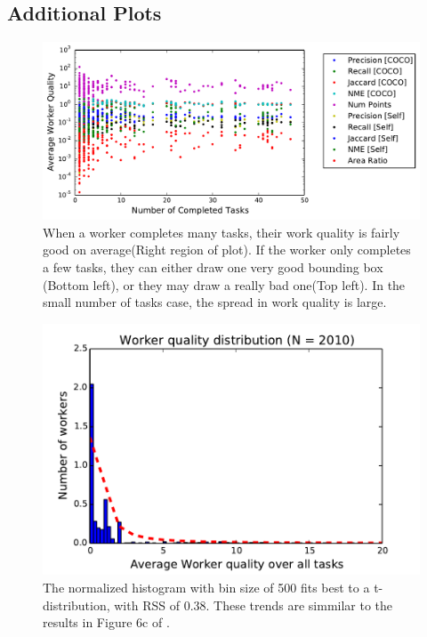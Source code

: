 \documentclass[12pt]{article}
\begin{document}
\begin{appendices}
\section{Additional Plots}
\begin{figure}[ht]
\centering
\includegraphics[width=0.9\linewidth]{plots/quality_vs_quantity.pdf}
\caption{ When a worker completes many tasks, their work quality is fairly good on average(Right region of plot). If the worker only completes a few tasks, they can either draw one very good bounding box (Bottom left), or they may draw a really bad one(Top left). In the small number of tasks case, the spread in work quality is large. }
\label{qvsqplot}
\end{figure}

\begin{figure}[ht!]
\centering
\includegraphics[width=0.8\linewidth]{plots/Wqual_dist.pdf}
\caption{The normalized histogram with bin size of 500 fits best to a t-distribution, with RSS of 0.38. These trends are simmilar to the results in Figure 6c of \cite{OCWelinder2010}.}
\label{Wqual}
\end{figure}

\end{appendices}
\end{document}
